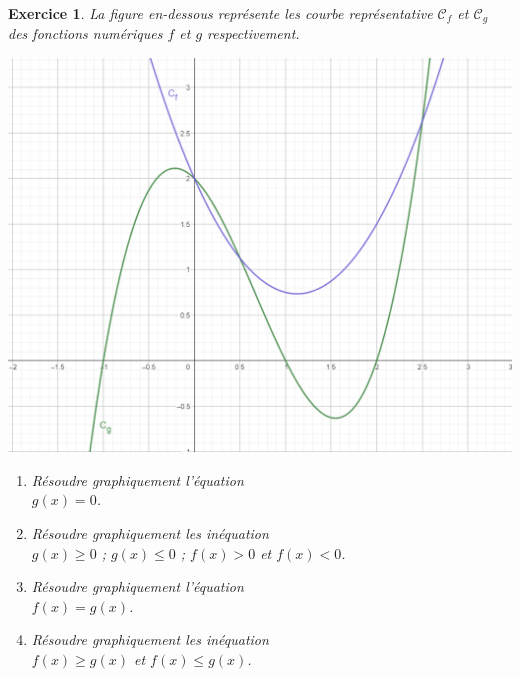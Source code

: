 \documentclass[12pt,a4paper]{article}
\theoremstyle{mystyle}
\newtheorem{exo}{Exercice}
\begin{document}
\begin{exo}
La figure en-dessous représente les courbe représentative $\mathcal{C}_f$ et $\mathcal{C}_g$ des fonctions numériques $f$ et $g$ respectivement.
\begin{center}
\includegraphics[scale=0.6]{graphe4.png}
\end{center}
\begin{enumerate}
	\item Résoudre graphiquement l'équation \\$g(x) =0$.
	\item Résoudre graphiquement les inéquation \\$g(x) \geq 0$ ; $g(x) \leq 0$ ; $f(x) > 0$ et $f(x) < 0$.
	\item Résoudre graphiquement l'équation \\$f(x) = g(x)$.
	\item Résoudre graphiquement les inéquation \\$f(x) \geq g(x)$ et $f(x) \leq g(x)$.
\end{enumerate}

\end{exo}
\end{document}
